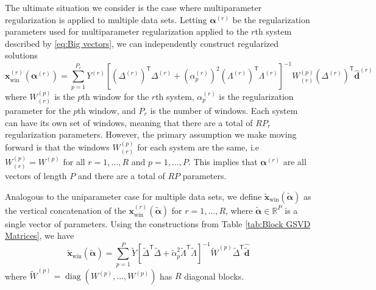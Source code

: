 \documentclass[12pt]{article}
\newcommand{\dVec}{\mathbf{d}}	%
\newcommand{\xVec}{\mathbf{x}}	%
\newcommand{\trans}[1]{{#1}^\mathsf{T}}	%
\newcommand{\inv}[1]{{#1}^{-1}}	%
\DeclareMathOperator{\diag}{diag}	%
\newcommand{\dft}[1]{\widehat{#1}}	%
\newcommand{\regparam}{\alpha}  %
\newcommand{\regparamVec}{\bm{\regparam}}   %
\newcommand{\regparamVecBig}{\widetilde{\regparamVec}}   %
\newcommand{\xWin}{\xVec_{\text{win}}}	%
\newcommand{\xBig}{\widetilde{\xVec}}	%
\newcommand{\xWinBig}{\xBig_{\text{win}}}	%
\newcommand{\dBig}{\widetilde{\dVec}}	%
\begin{document}
The ultimate situation we consider is the case where multiparameter regularization is applied to multiple data sets. Letting $\regparamVec^{(r)}$ be the regularization parameters used for multiparameter regularization applied to the $r$th system described by \eqref{eq:Big vectors}, we can independently construct regularized solutions
\[\xWin^{(r)}\left(\regparamVec^{(r)}\right) = \sum_{p=1}^{P_r} Y^{(r)}\inv{\left[\trans{\left(\Delta^{(r)}\right)}\Delta^{(r)} + \left(\regparam^{(r)}_p\right)^2 \trans{\left(\Lambda^{(r)}\right)}\Lambda^{(r)}\right]}W^{(p)}_{(r)}\trans{\left(\Delta^{(r)}\right)}\dft{\dVec}^{(r)}\]
where $W^{(p)}_{(r)}$ is the $p$th window for the $r$th system, $\regparam^{(r)}_p$ is the regularization parameter for the $p$th window, and $P_r$ is the number of windows. Each system can have its own set of windows, meaning that there are a total of $RP_r$ regularization parameters. However, the primary assumption we make moving forward is that the windows $W^{(p)}_{(r)}$ for each system are the same, i.e $W^{(p)}_{(r)} = W^{(p)}$ for all $r = 1,\ldots,R$ and $p = 1,\ldots,P$. This implies that $\regparamVec^{(r)}$ are all vectors of length $P$ and there are a total of $RP$ parameters. \par
Analogous to the uniparameter case for multiple data sets, we define $\xWinBig(\regparamVecBig)$ as the vertical concatenation of the $\xWin^{(r)}\left(\regparamVecBig\right)$ for $r = 1,\ldots,R$, where $\regparamVecBig \in \mathbb{R}^P$ is a single vector of parameters. Using the constructions from Table \ref{tab:Block GSVD Matrices}, we have
\begin{equation}
\label{eq:Big Windowed Solution}
    \xWinBig(\regparamVecBig) = \sum_{p=1}^{P} \widetilde{Y}\inv{\left[\trans{\widetilde{\Delta}}\widetilde{\Delta} + \widetilde{\regparam}_p^2 \trans{\widetilde{\Lambda}}\widetilde{\Lambda}\right]}\widetilde{W}^{(p)}\trans{\widetilde{\Delta}}\dft{\dBig}
\end{equation}
where $\widetilde{W}^{(p)} = \diag(W^{(p)},\ldots,W^{(p)})$ has $R$ diagonal blocks.
\end{document}
